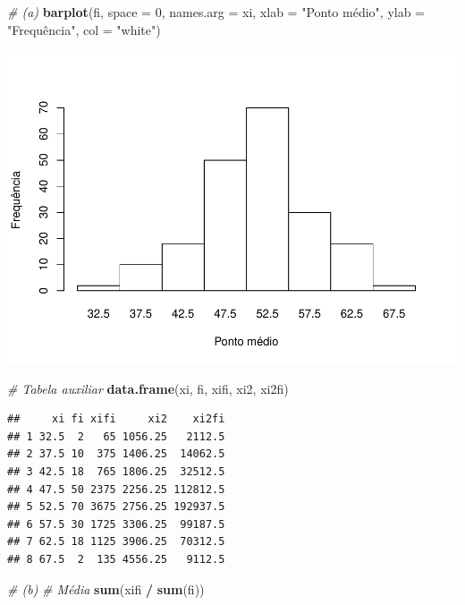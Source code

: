 \documentclass[]{article}
\newenvironment{Shaded}{\begin{snugshade}}{\end{snugshade}}
\newcommand{\KeywordTok}[1]{\textcolor[rgb]{0.13,0.29,0.53}{\textbf{#1}}}
\newcommand{\DataTypeTok}[1]{\textcolor[rgb]{0.13,0.29,0.53}{#1}}
\newcommand{\DecValTok}[1]{\textcolor[rgb]{0.00,0.00,0.81}{#1}}
\newcommand{\StringTok}[1]{\textcolor[rgb]{0.31,0.60,0.02}{#1}}
\newcommand{\CommentTok}[1]{\textcolor[rgb]{0.56,0.35,0.01}{\textit{#1}}}
\newcommand{\OperatorTok}[1]{\textcolor[rgb]{0.81,0.36,0.00}{\textbf{#1}}}
\newcommand{\NormalTok}[1]{#1}
\begin{document}
\begin{Shaded}
\begin{Highlighting}[]
\CommentTok{# (a)}
\KeywordTok{barplot}\NormalTok{(fi, }
        \DataTypeTok{space =} \DecValTok{0}\NormalTok{, }
        \DataTypeTok{names.arg =}\NormalTok{ xi, }
        \DataTypeTok{xlab =} \StringTok{"Ponto médio"}\NormalTok{, }
        \DataTypeTok{ylab =} \StringTok{"Frequência", }
\StringTok{        col = "}\NormalTok{white}\StringTok{")}
\end{Highlighting}
\end{Shaded}

\includegraphics{Lista_2_Gabarito_files/figure-latex/unnamed-chunk-10-1.pdf}

\begin{Shaded}
\begin{Highlighting}[]
\CommentTok{# Tabela auxiliar}
\KeywordTok{data.frame}\NormalTok{(xi, fi, xifi, xi2, xi2fi)}
\end{Highlighting}
\end{Shaded}

\begin{verbatim}
##     xi fi xifi     xi2    xi2fi
## 1 32.5  2   65 1056.25   2112.5
## 2 37.5 10  375 1406.25  14062.5
## 3 42.5 18  765 1806.25  32512.5
## 4 47.5 50 2375 2256.25 112812.5
## 5 52.5 70 3675 2756.25 192937.5
## 6 57.5 30 1725 3306.25  99187.5
## 7 62.5 18 1125 3906.25  70312.5
## 8 67.5  2  135 4556.25   9112.5
\end{verbatim}

\begin{Shaded}
\begin{Highlighting}[]
\CommentTok{# (b)}
\CommentTok{# Média}
\KeywordTok{sum}\NormalTok{(xifi }\OperatorTok{/}\StringTok{ }\KeywordTok{sum}\NormalTok{(fi))}
\end{Highlighting}
\end{Shaded}
\end{document}
